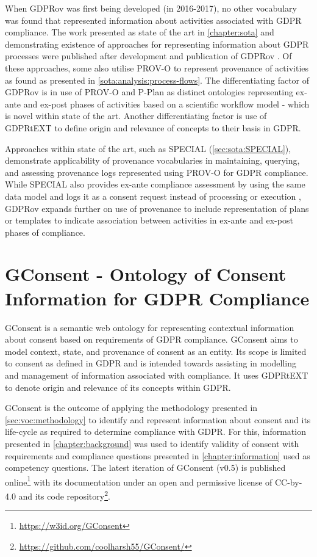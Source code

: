 When GDPRov was first being developed (in 2016-2017), no other vocabulary was found that represented information about activities associated with GDPR compliance.
The work presented as state of the art in \autoref{chapter:sota} and demonstrating existence of approaches for representing information about GDPR processes were published after development and publication of GDPRov \cite{pandit_modelling_2017}. Of these approaches, some also utilise PROV-O to represent provenance of activities as found as presented in \autoref{sota:analysis:process-flows}. The differentiating factor of GDPRov is in use of PROV-O and P-Plan as distinct ontologies representing ex-ante and ex-post phases of activities based on a scientific workflow model - which is novel within state of the art. Another differentiating factor is use of GDPRtEXT to define origin and relevance of concepts to their basis in GDPR.

Approaches within state of the art, such as SPECIAL (\autoref{sec:sota:SPECIAL}), demonstrate applicability of provenance vocabularies in maintaining, querying, and assessing provenance logs represented using PROV-O for GDPR compliance.
While SPECIAL also provides ex-ante compliance assessment by using the same data model and logs it as a consent request instead of processing or execution \cite{dullaert_d3.4_2019}, GDPRov expands further on use of provenance to include representation of plans or templates to indicate association between activities in ex-ante and ex-post phases of compliance.

\section{GConsent - Ontology of Consent Information for GDPR Compliance}\label{sec:voc:GConsent}
GConsent is a semantic web ontology for representing contextual information about consent based on requirements of GDPR compliance. 
GConsent aims to model context, state, and provenance of consent as an entity.
Its scope is limited to consent as defined in GDPR and is intended towards assisting in modelling and management of information associated with compliance.
It uses GDPRtEXT to denote origin and relevance of its concepts within GDPR.

GConsent is the outcome of applying the methodology presented in \autoref{sec:voc:methodology} to identify and represent information about consent and its life-cycle as required to determine compliance with GDPR.
For this, information presented in \autoref{chapter:background} was used to identify validity of consent with requirements and compliance questions presented in \autoref{chapter:information} used as competency questions.
The latest iteration of GConsent (v0.5) is published online\footnote{\url{https://w3id.org/GConsent}} with its documentation under an open and permissive license of CC-by-4.0 and its code repository\footnote{\url{https://github.com/coolharsh55/GConsent/}}.

